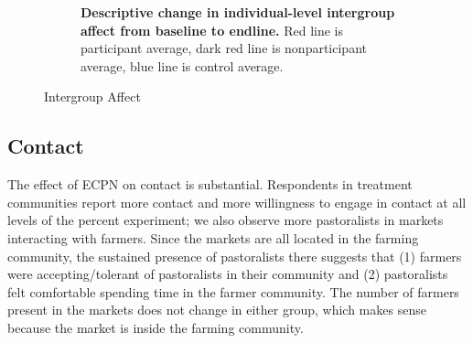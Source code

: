 \documentclass[11pt]{article}
\begin{document}
\begin{figure}[H]
\begin{subfigure}[b]{.48\textwidth}
        \caption{\textbf{Descriptive change in individual-level intergroup affect from baseline to endline.} Red line is participant average, dark red line is nonparticipant average, blue line is control average.}
        \label{fig:fig4}
    \end{subfigure}
\caption{Intergroup Affect}
\end{figure}

\hypertarget{contact}{%
\subsection{Contact}\label{contact}}

The effect of ECPN on contact is substantial. Respondents in treatment
communities report more contact and more willingness to engage in
contact at all levels of the percent experiment; we also observe more
pastoralists in markets interacting with farmers. Since the markets are
all located in the farming community, the sustained presence of
pastoralists there suggests that (1) farmers were accepting/tolerant of
pastoralists in their community and (2) pastoralists felt comfortable
spending time in the farmer community. The number of farmers present in
the markets does not change in either group, which makes sense because
the market is inside the farming community.
\end{document}
